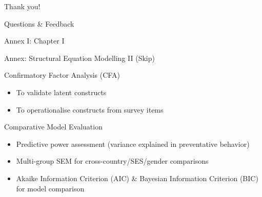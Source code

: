 \documentclass[
  ignorenonframetext,
]{beamer}
\providecommand{\tightlist}{%
  \setlength{\itemsep}{0pt}\setlength{\parskip}{0pt}}\usepackage{longtable,booktabs,array}
\begin{document}
\begin{frame}{Thank you!}
\label{thank-you}
\end{frame}

\begin{frame}{Questions \& Feedback}
\label{questions-feedback}
\end{frame}

\begin{frame}{Annex I: Chapter I}
\label{annex-i-chapter-i}
\begin{block}{Annex: Structural Equation Modelling II (Skip)}
\label{annex-structural-equation-modelling-ii-skip}
\begin{block}{Confirmatory Factor Analysis (CFA)}
\label{confirmatory-factor-analysis-cfa}
\begin{itemize}
\tightlist
\item
  To validate latent constructs
\item
  To operationalise constructs from survey items
\end{itemize}
\end{block}

\begin{block}{Comparative Model Evaluation}
\label{comparative-model-evaluation}
\begin{itemize}
\tightlist
\item
  Predictive power assessment (variance explained in preventative
  behavior)
\item
  Multi-group SEM for cross-country/SES/gender comparisons
\item
  Akaike Information Criterion (AIC) \& Bayesian Information Criterion
  (BIC) for model comparison
\end{itemize}
\end{block}
\end{block}
\end{frame}
\end{document}
